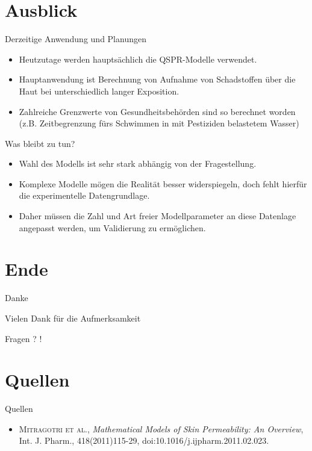 \documentclass[utf8x,compress,professionalfonts]{beamer}
\begin{document}
\section{Ausblick}
\begin{frame}{Derzeitige Anwendung und Planungen}
  \begin{itemize}
    \item Heutzutage werden haupts\"achlich die QSPR-Modelle verwendet.
      \bigskip
    \item Hauptanwendung ist Berechnung von Aufnahme von Schadstoffen \"uber die
      Haut bei unterschiedlich langer Exposition.
      \bigskip
    \item Zahlreiche Grenzwerte von Gesundheitsbeh\"orden sind so berechnet worden
      (z.B. Zeitbegrenzung f\"urs Schwimmen in mit Pestiziden belastetem Wasser)
  \end{itemize}
\end{frame}

\begin{frame}{Was bleibt zu tun?}
  \begin{itemize}
    \item<1-> Wahl des Modells ist sehr stark abh\"angig von der Fragestellung.
      \bigskip
    \item<2-> Komplexe Modelle m\"ogen die Realit\"at besser widerspiegeln, doch
      fehlt hierf\"ur die experimentelle Datengrundlage.
      \bigskip
    \item<3-> Daher m\"ussen die Zahl und Art freier Modellparameter an diese
      Datenlage angepasst werden, um Validierung zu erm\"oglichen.
  \end{itemize}
\end{frame}


\section{Ende}
\begin{frame}{Danke}
  \begin{center}\Large
    Vielen Dank f\"ur die Aufmerksamkeit

    \vfill

    Fragen ? !
  \end{center}
\end{frame}


\section{Quellen}
\begin{frame}{Quellen}
  \begin{itemize}
    \item \textsc{Mitragotri et al.},
      \textit{Mathematical Models of Skin Permeability: An Overview},
      Int. J. Pharm., 418(2011)115-29, doi:10.1016/j.ijpharm.2011.02.023.
  \end{itemize}
\end{frame}
\end{document}

